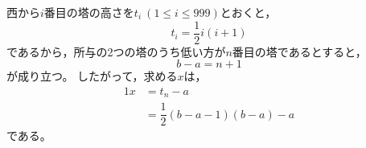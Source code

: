 \documentclass{article}
\begin{document}
西から$i$番目の塔の高さを$t_i\ (1 \leq i \leq 999)$とおくと，
\begin{equation}
    t_i = \dfrac{1}{2} i (i + 1)
\end{equation}
であるから，所与の2つの塔のうち低い方が$n$番目の塔であるとすると，
\begin{equation}
    b - a = n + 1
\end{equation}
が成り立つ。
したがって，求める$x$は，
\begin{alignat}{1}
    x &= t_n - a \\
      &= \dfrac{1}{2} (b - a - 1) (b - a) - a
\end{alignat}
である。
\end{document}

